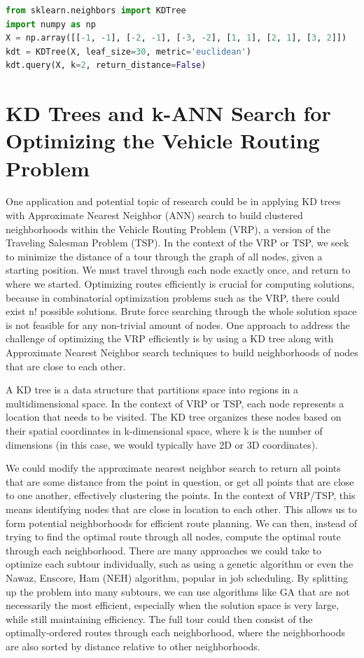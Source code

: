 \documentclass{article}
\begin{document}
            \begin{lstlisting}[language = Python, caption = \texttt{KDTree}]
from sklearn.neighbors import KDTree
import numpy as np
X = np.array([[-1, -1], [-2, -1], [-3, -2], [1, 1], [2, 1], [3, 2]])
kdt = KDTree(X, leaf_size=30, metric='euclidean')
kdt.query(X, k=2, return_distance=False)
            \end{lstlisting}

\pagebreak
    \section*{KD Trees and k-ANN Search for Optimizing the Vehicle Routing Problem}
One application and potential topic of research could be in applying KD trees with Approximate Nearest Neighbor (ANN) search to build clustered neighborhoods within the Vehicle Routing Problem (VRP), a version of the Traveling Salesman Problem (TSP). In the context of the VRP or TSP, we seek to minimize the distance of a tour through the graph of all nodes, given a starting position. We must travel through each node exactly once, and return to where we started. Optimizing routes efficiently is crucial for computing solutions, because in combinatorial optimization problems such as the VRP, there could exist n! possible solutions. Brute force searching through the whole solution space is not feasible for any non-trivial amount of nodes. One approach to address the challenge of optimizing the VRP efficiently is by using a KD tree along with Approximate Nearest Neighbor search techniques to build neighborhoods of nodes that are close to each other.

A KD tree is a data structure that partitions space into regions in a multidimensional space. In the context of VRP or TSP, each node represents a location that needs to be visited. The KD tree organizes these nodes based on their spatial coordinates in k-dimensional space, where k is the number of dimensions (in this case, we would typically have 2D or 3D coordinates).

We could modify the approximate nearest neighbor search to return all points that are some distance from the point in question, or get all points that are close to one another, effectively clustering the points. In the context of VRP/TSP, this means identifying nodes that are close in location to each other. This allows us to form potential neighborhoods for efficient route planning. We can then, instead of trying to find the optimal route through all nodes, compute the optimal route through each neighborhood. There are many approaches we could take to optimize each subtour individually, such as using a genetic algorithm or even the Nawaz, Enscore, Ham (NEH) algorithm, popular in job scheduling. By splitting up the problem into many subtours, we can use algorithms like GA that are not necessarily the most efficient, especially when the solution space is very large, while still maintaining efficiency. The full tour could then consist of the optimally-ordered routes through each neighborhood, where the neighborhoods are also sorted by distance relative to other neighborhoods.
\end{document}
